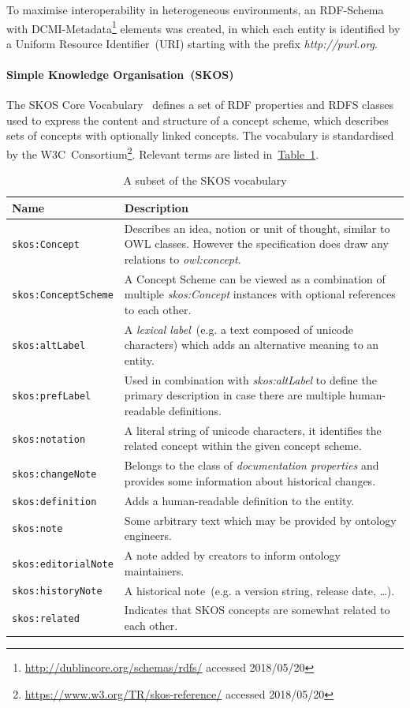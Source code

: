 \documentclass[draft,final]{vutinfth} %
\begin{document}
To maximise interoperability in heterogeneous environments, an RDF-Schema with DCMI-Metadata\footnote{\url{http://dublincore.org/schemas/rdfs/} accessed 2018/05/20} elements was created, in which each entity is identified by a Uniform Resource Identifier~(URI) starting with the prefix \emph{http://purl.org}. 

\paragraph{Simple Knowledge Organisation~(SKOS)} The SKOS Core Vocabulary~\cite{skos2005} defines a set of RDF properties and RDFS classes
used to express the content and structure of a concept scheme, which describes sets of concepts with optionally linked concepts. The vocabulary is standardised by the W3C~Consortium\footnote{\url{https://www.w3.org/TR/skos-reference/} accessed 2018/05/20}. Relevant terms are listed in~\hyperref[table:skos]{Table~\ref*{table:skos}}.

\begingroup
\renewcommand{\arraystretch}{2}
\begin{table}
	\begin{tabularx}{\textwidth}{l|X}
		\textbf{Name} & \textbf{Description} \\
		\hline
		\texttt{skos:Concept} & Describes an idea, notion or unit of thought, similar to OWL classes. However the specification does draw any relations to \textit{owl:concept}.\\
		\texttt{skos:ConceptScheme} & A Concept Scheme can be viewed as a combination of multiple \textit{skos:Concept} instances with optional references to each other.\\
		\texttt{skos:altLabel} & A \textit{lexical label}~(e.g. a text composed of unicode characters) which adds an alternative meaning to an entity. \\
		\texttt{skos:prefLabel} & Used in combination with \textit{skos:altLabel} to define the primary description in case there are multiple human-readable definitions.\\
		\texttt{skos:notation} & A literal string of unicode characters, it identifies the related concept within the given concept scheme.\\
		\texttt{skos:changeNote} & Belongs to the class of \textit{documentation properties} and provides some information about historical changes.\\
		\texttt{skos:definition} & Adds a human-readable definition to the entity.\\
		\texttt{skos:note} & Some arbitrary text which may be provided by ontology engineers.\\
		\texttt{skos:editorialNote} & A note added by creators to inform ontology maintainers.\\
		\texttt{skos:historyNote} & A historical note~(e.g. a version string, release date, \ldots ).\\
        \texttt{skos:related} & Indicates that SKOS concepts are somewhat related to each other.\\
	\end{tabularx}
	\caption{A subset of the SKOS vocabulary}
	\label{table:skos}
\end{table}
\endgroup
\end{document}
